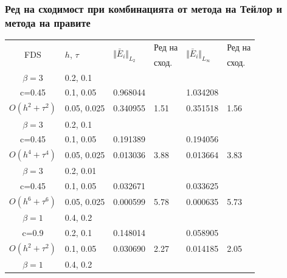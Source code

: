 \documentclass{article}
\theoremstyle{remark}
\begin{document}
\subsubsection{Ред на сходимост при комбинацията от метода на Тейлор и метода на правите}
\begin{table}[ht]
\centering
\small
		\begin{tabular}{||c|l|ll|ll||}
			\hline
			\hline


      \multirow{2  }{*}{FDS}        & \multirow{2  }{*}{$h$, $\tau$}  &	\multirow{2  }{*}{  $\Vert \bar E_i \Vert_{L_2} $ } 	&Ред на & \multirow{2  }{*}{  $\Vert \bar E_i \Vert_{L_\infty}$ }	&Ред на   \\
	                                        &                                                &    										&  сход. & 										& сход. \\
\hline 
\hline 
  $\beta=3$               &0.2, 0.1      &              	&           &                	&      \\
   c=0.45                   &0.1, 0.05    &0.968044  	&           &1.034208   &       \\
 $O(h^2 + \tau^ 2)$ 	&0.05, 0.025	& 0.340955 	& 1.51    &0.351518  	&  1.56      \\
\hline 
  $\beta=3$               &0.2, 0.1      &              	&          	&                 &      \\
   c=0.45                   &0.1, 0.05    &0.191389 	&          	&0.194056   	&       \\
$O(h^4+ \tau^4)$	&0.05, 0.025	&0.013036 	& 3.88   	&0.013664   	& 3.83       \\
\hline 
  $\beta=3$               &0.2, 0.01    &                	&          	&                 &      \\
     c=0.45                 &0.1, 0.05    &0.032671 	&          	& 0.033625  	&       \\
  $O(h^6+ \tau^6)$ 	&0.05, 0.025	&0.000599 	&5.78    	& 0.000635  	& 5.73       \\
\hline
\hline 
       $\beta=1$        	&0.4, 0.2      &             	&            &           &   \\
           c=0.9    		&0.2, 0.1      &  0.148014 	&            &0.058905 &   \\
  $O(h^2+ \tau^2)$  	&0.1, 0.05   	& 0.030690  	&2.27  	 &0.014185   & 2.05 \\
\hline
      $\beta=1$           &0.4, 0.2    	&            	&               &             &    \\

\end{tabular}
\end{table}
\end{document}
